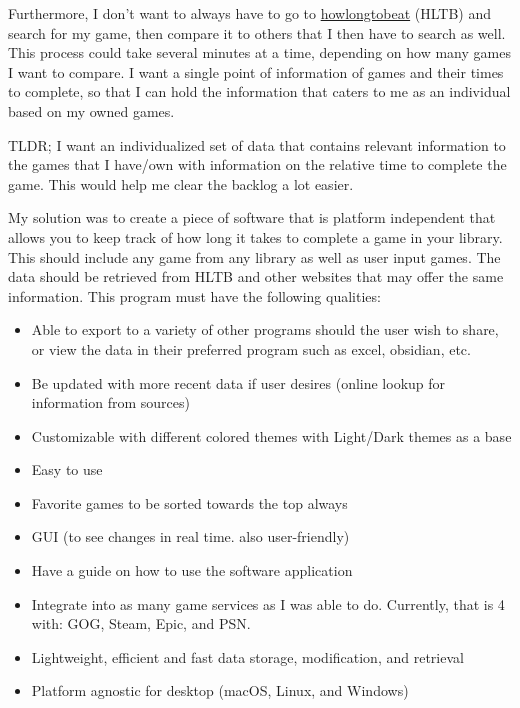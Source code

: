 Furthermore, I don't want to always have to go to
\href{https://howlongtobeat.com/}{howlongtobeat} (HLTB) and search for my game,
then compare it to others that I then have to search as well. This
process could take several minutes at a time, depending on how many
games I want to compare. I want a single point of information of
games and their times to complete, so that I can hold the information
that caters to me as an individual based on my owned games.

TLDR;
I want an individualized set of data that contains relevant
information to the games that I have/own with information on the
relative time to complete the game. This would help me clear
the backlog a lot easier.

My solution was to create a piece of software that is platform
independent that allows you to keep track of how long it takes to
complete a game in your library. This should include any game from
any library as well as user input games. The data should be retrieved
from HLTB and other websites that may offer the same information.
This program must have the following qualities:

\begin{itemize}
	\item Able to export to a variety of other programs should the user
		wish to share, or view the data in their preferred program such as
		excel, obsidian, etc.
	\item Be updated with more recent data if user desires (online
		lookup for information from sources)
	\item Customizable with different colored themes with Light/Dark
		themes as a base
	\item Easy to use
	\item Favorite games to be sorted towards the top always
	\item GUI (to see changes in real time. also user-friendly)
	\item Have a guide on how to use the software application
	\item Integrate into as many game services as I was able to do.
		Currently, that is 4 with: GOG, Steam, Epic, and PSN.
	\item Lightweight, efficient and fast data storage, modification, and retrieval
	\item Platform agnostic for desktop (macOS, Linux, and Windows)
\end{itemize}
